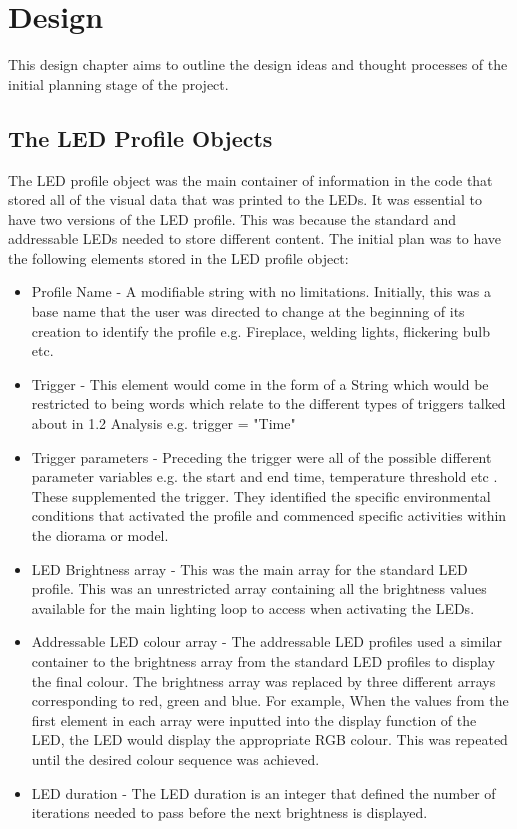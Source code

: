 \chapter{Design}
This design chapter aims to outline the design ideas and thought processes of the initial planning stage of the project. 

\section {The LED Profile Objects}
The LED profile object was the main container of information in the code that stored all of the visual data that was printed to the LEDs. It was essential to have two versions of the LED profile. This was because the standard and addressable LEDs needed to store different content. The initial plan was to have the following elements stored in the LED profile object:
\begin{itemize}
\item Profile Name - A modifiable string with no limitations. Initially, this was a base name that the user was directed to change at the beginning of its creation to identify the profile e.g. Fireplace, welding lights, flickering bulb etc. 

\item Trigger - This element would come in the form of a String which would be restricted to being words which relate to the different types of triggers talked about in 1.2 Analysis e.g. trigger = "Time"

\item Trigger parameters - Preceding the trigger were all of the possible different parameter variables e.g. the start and end time, temperature threshold etc . These supplemented the trigger. They identified the specific environmental conditions that activated the profile and commenced specific activities within the diorama or model. 

\item LED Brightness array - This was the main array for the standard LED profile. This was an unrestricted array containing all the brightness values available for the main lighting loop to access when activating the LEDs.

\item Addressable LED colour array - The addressable LED profiles used a similar container to the brightness array from the standard LED profiles to display the final colour. The brightness array was replaced by three different arrays corresponding to red, green and blue. For example, When the values from the first element in each array were inputted into the display function of the LED, the LED would display the appropriate RGB colour. This was repeated until the desired colour sequence was achieved.

\item LED duration - The LED duration is an integer that defined the number of iterations needed to pass before the next brightness is displayed. 
\end{itemize}

